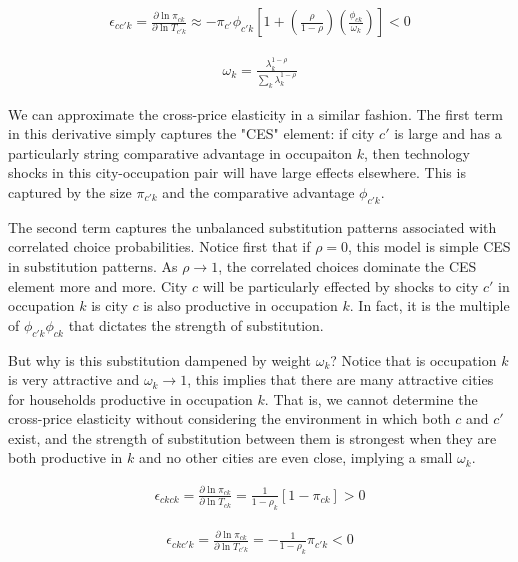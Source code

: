\documentclass[10pt]{article}
\begin{document}
\begin{align}
    \epsilon_{cc'k} = \frac{\partial \ln \pi_{ck}}{\partial \ln T_{c'k}} \approx - \pi_{c'} \phi_{c'k} \left[ 1 + \left( \frac{\rho}{1 - \rho} \right) \left( \frac{\phi_{ck}}{\omega_k} \right) \right] < 0
    \label{cross_city_elasticity}
\end{align}

\begin{align}
    \omega_k = \frac{\lambda_k^{1 - \rho}}{\sum_{k}^{} \lambda_k^{1 - \rho}}
\end{align}

We can approximate the cross-price elasticity in a similar fashion. The first term in this derivative simply captures the "CES" element: if city $c'$ is large and has a particularly string comparative advantage in occupaiton $k$, then technology shocks in this city-occupation pair will have large effects elsewhere. This is captured by the size $\pi_{c'k}$ and the comparative advantage $\phi_{c'k}$.

The second term captures the unbalanced substitution patterns associated with correlated choice probabilities. Notice first that if $\rho = 0$, this model is simple CES in substitution patterns. As $\rho \to 1$, the correlated choices dominate the CES element more and more. City $c$ will be particularly effected by shocks to city $c'$ in occupation $k$ is city $c$ is also productive in occupation $k$. In fact, it is the multiple of $\phi_{c'k} \phi_{ck}$ that dictates the strength of substitution.

But why is this substitution dampened by weight $\omega_k$? Notice that is occupation $k$ is very attractive and $\omega_k \to 1$, this implies that there are many attractive cities for households productive in occupation $k$. That is, we cannot determine the cross-price elasticity without considering the environment in which both $c$ and $c'$ exist, and the strength of substitution between them is strongest when they are both productive in $k$ and no other cities are even close, implying a small $\omega_k$.

\begin{align}
    \epsilon_{ckck} = \frac{\partial \ln \pi_{ck}}{\partial \ln T_{ck}} = \frac{1}{1 - \rho_k} \left[ 1 - \pi_{ck} \right] > 0
    \label{within_occuaption_elasticity}
\end{align}

\begin{align}
    \epsilon_{ckc'k} = \frac{\partial \ln \pi_{ck}}{\partial \ln T_{c'k}} = - \frac{1}{1 - \rho_k} \pi_{c'k} < 0
    \label{cross_occuaption_elasticity}
\end{align}
\end{document}
